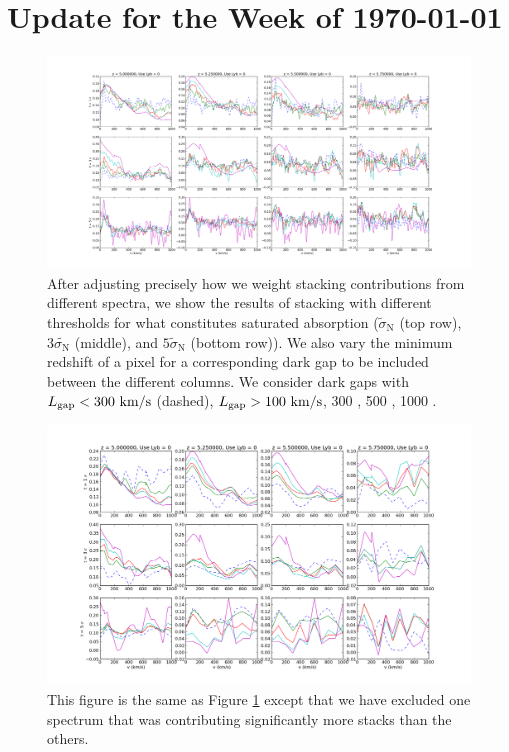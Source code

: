 \documentclass[11pt]{article}
\begin{document}
\section*{Update for the Week of \today}


\begin{figure}[h]
  \centering
  \includegraphics[width=20cm]{gridPlot.png}
  \caption{After adjusting precisely how we weight stacking contributions from different spectra, we show the results of stacking with different thresholds for what constitutes saturated absorption ($\tilde{\sigma}_{\text{N}}$ (top row), $3\tilde{\sigma_{\text{N}}}$ (middle), and $5\tilde{\sigma}_{\text{N}}$ (bottom row)). We also vary the minimum redshift of a pixel for a corresponding dark gap to be included between the different columns. We consider dark gaps with $L_{\text{gap}} < 300\ \text{km}/\text{s}$ (dashed), $L_{\text{gap}} > 100\ \text{km}/\text{s}$, 300 \kms, 500 \kms, 1000 \kms.}
  \label{fig:grid}
\end{figure}

\begin{figure}[h]
  \centering
  \includegraphics[width=20cm]{gridPlot_noZ599.png}
  \caption{This figure is the same as Figure \ref{fig:grid} except that we have excluded one spectrum that was contributing significantly more stacks than the others.}
  \label{fig:regrid}
\end{figure}
\end{document}
